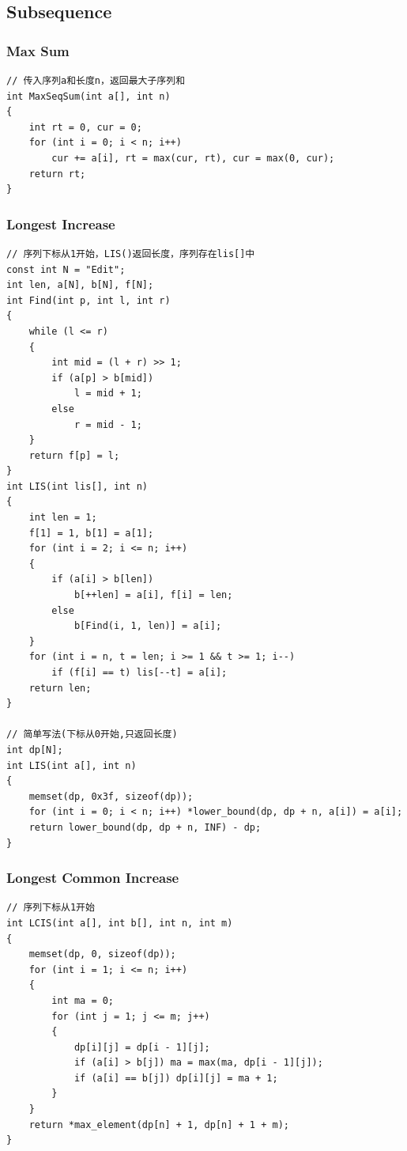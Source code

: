 \documentclass[twoside]{article}
\begin{document}
\subsection{Subsequence}
\subsubsection{Max Sum}
\begin{lstlisting}
// 传入序列a和长度n，返回最大子序列和
int MaxSeqSum(int a[], int n)
{
    int rt = 0, cur = 0;
    for (int i = 0; i < n; i++)
        cur += a[i], rt = max(cur, rt), cur = max(0, cur);
    return rt;
}
\end{lstlisting}
\subsubsection{Longest Increase}
\begin{lstlisting}
// 序列下标从1开始，LIS()返回长度，序列存在lis[]中
const int N = "Edit";
int len, a[N], b[N], f[N];
int Find(int p, int l, int r)
{
    while (l <= r)
    {
        int mid = (l + r) >> 1;
        if (a[p] > b[mid])
            l = mid + 1;
        else
            r = mid - 1;
    }
    return f[p] = l;
}
int LIS(int lis[], int n)
{
    int len = 1;
    f[1] = 1, b[1] = a[1];
    for (int i = 2; i <= n; i++)
    {
        if (a[i] > b[len])
            b[++len] = a[i], f[i] = len;
        else
            b[Find(i, 1, len)] = a[i];
    }
    for (int i = n, t = len; i >= 1 && t >= 1; i--)
        if (f[i] == t) lis[--t] = a[i];
    return len;
}

// 简单写法(下标从0开始,只返回长度)
int dp[N];
int LIS(int a[], int n)
{
    memset(dp, 0x3f, sizeof(dp));
    for (int i = 0; i < n; i++) *lower_bound(dp, dp + n, a[i]) = a[i];
    return lower_bound(dp, dp + n, INF) - dp;
}
\end{lstlisting}
\subsubsection{Longest Common Increase}
\begin{lstlisting}
// 序列下标从1开始
int LCIS(int a[], int b[], int n, int m)
{
    memset(dp, 0, sizeof(dp));
    for (int i = 1; i <= n; i++)
    {
        int ma = 0;
        for (int j = 1; j <= m; j++)
        {
            dp[i][j] = dp[i - 1][j];
            if (a[i] > b[j]) ma = max(ma, dp[i - 1][j]);
            if (a[i] == b[j]) dp[i][j] = ma + 1;
        }
    }
    return *max_element(dp[n] + 1, dp[n] + 1 + m);
}
\end{lstlisting}
\end{document}
